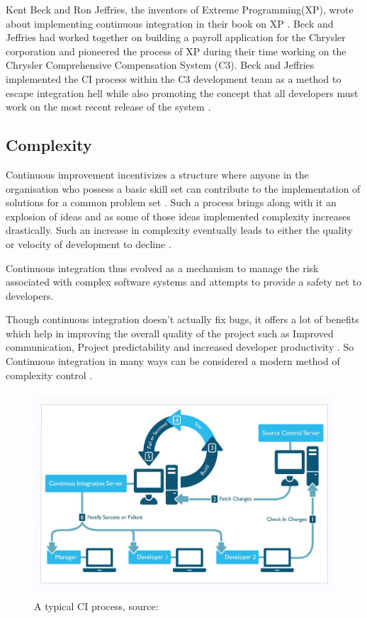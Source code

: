 \documentclass[12pt,conference]{IEEEtran}
\begin{document}
Kent Beck and Ron Jeffries, the inventors of Extreme Programming(XP), wrote about implementing continuous integration in their book on XP \cite{astesiano_fundamental_1998}. Beck and Jeffries had worked together on building a payroll application for the Chrysler corporation and pioneered the process of XP during their time working on the Chrysler Comprehensive Compensation System (C3). Beck and Jeffries implemented the CI process within the C3 development team as a method to escape integration hell while also promoting the concept that all developers must work on the most recent release of the system \cite{cunningham_cunningham_2011}.

\subsection*{Complexity}
Continuous improvement incentivizes a structure where anyone in the organisation who possess  a basic skill set can contribute to the implementation of solutions for a common problem set \cite{bessant_rediscovering_1994}. Such a process brings along with it an explosion of ideas and as some of those ideas implemented complexity increases drastically. Such an increase in complexity eventually leads to either the quality or velocity of development to decline \cite{zaytsev_increasing_2013}. 

Continuous integration thus evolved as a mechanism to manage the risk associated with complex software systems \cite{zaytsev_increasing_2013} and  attempts to provide a safety net \cite{fowler_continuous_2006} to developers. 

Though continuous integration doesn't actually fix bugs, it offers a lot of benefits which help in improving the overall quality of the project such as Improved communication, Project predictability and increased developer productivity \cite{sta_ahl_experienced_2013}. So Continuous integration in many ways can be considered a modern method of complexity control \cite{beck_extreme_2000}.

\begin{figure}[Ht!]
  \centering
  \includegraphics[height=3in]{ci_process}
  \caption{A typical CI process, source: \cite{cois_continuous_2015}}
  \label{leakyabstraction}
\end{figure}
\end{document}
